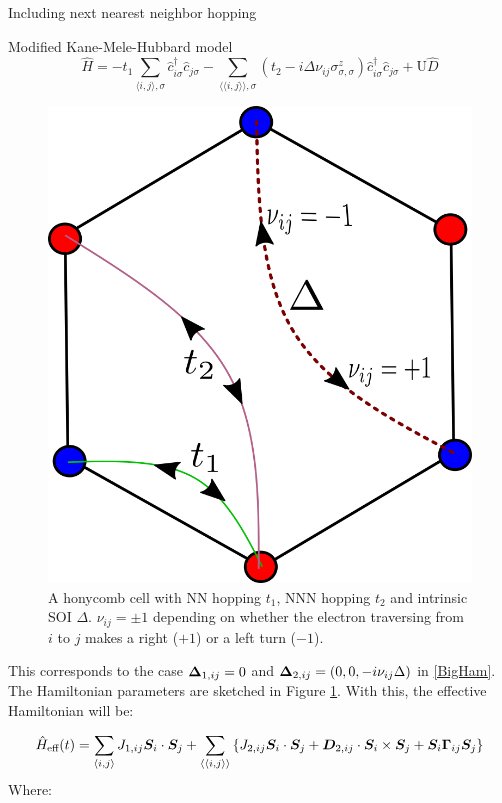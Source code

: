 \begin{section}{Including next nearest neighbor hopping}
\begin{subsection}{Modified Kane-Mele-Hubbard model}
\begin{equation}
\label{MKMH}
\hat{H} = - t_1\sum_{\langle i,j \rangle, \sigma} \hat{c}_{i \sigma}^\dagger \hat{c}_{j \sigma} -
	\sum_{\langle \langle i,j \rangle \rangle, \sigma}(t_2 - i\Delta\nu_{ij}\sigma^z_{\sigma, \sigma})\hat{c}_{i \sigma}^\dagger \hat{c}_{j \sigma} + 
	\text{U}\hat{D}
\end{equation}
\begin{figure}
\centering
\includegraphics[width=0.5\columnwidth]{../Figures/kmh.png}
\caption{A honycomb cell with NN hopping $t_1$, NNN hopping $t_2$ and intrinsic SOI $\Delta$. $\nu_{ij} = \pm 1$ depending on whether the electron traversing from $i$ to $j$ makes a right ($+1$) or a left turn ($-1$).}
\label{fig:MKMH}
\vspace*{-6pt}
\end{figure}
This corresponds to the case $\boldsymbol{\Delta}_{1,ij} = 0$ and $\boldsymbol{\Delta}_{2,ij} = (0, 0, -i\nu_{ij} \Delta)$ in \ref{BigHam}. The Hamiltonian parameters are sketched in Figure \ref{fig:MKMH}. With this, the effective Hamiltonian will be:

\begin{equation}
\label{MKMHeff}
\hat{H}_{\text{eff}}(t) = \sum_{\langle i,j \rangle} J_{1,ij}\boldsymbol{S}_i\cdot\boldsymbol{S}_j + \sum_{\langle \langle i,j \rangle \rangle} \left\{ J_{2,ij}\boldsymbol{S}_i\cdot\boldsymbol{S}_j + \boldsymbol{D}_{2,ij}\cdot \boldsymbol{S}_i \times \boldsymbol{S}_j + \boldsymbol{S}_i \boldsymbol{\Gamma}_{ij} \boldsymbol{S}_j \right\}
\end{equation}
Where:


\end{subsection}
\end{section}
